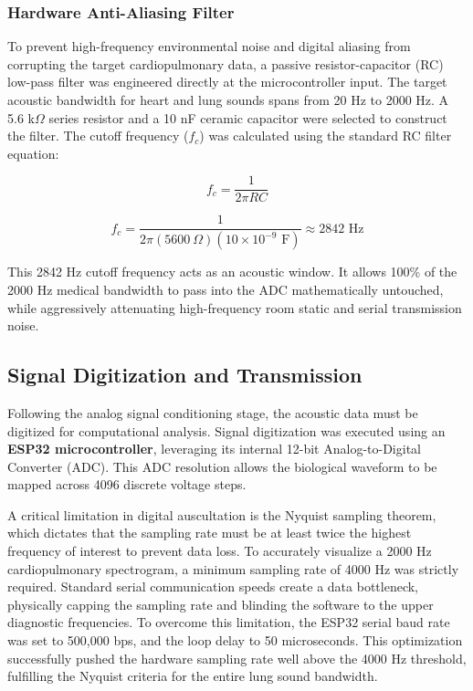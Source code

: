 \subsubsection{Hardware Anti-Aliasing Filter}
To prevent high-frequency environmental noise and digital aliasing from corrupting the target cardiopulmonary data, a passive resistor-capacitor (RC) low-pass filter was engineered directly at the microcontroller input. The target acoustic bandwidth for heart and lung sounds spans from 20 Hz to 2000 Hz. A 5.6 k$\Omega$ series resistor and a 10 nF ceramic capacitor were selected to construct the filter. The cutoff frequency ($f_c$) was calculated using the standard RC filter equation:

\begin{equation}
f_c = \frac{1}{2 \pi R C}
\end{equation}

\begin{equation}
f_c = \frac{1}{2 \pi (5600\ \Omega) (10 \times 10^{-9}\text{ F})} \approx 2842\text{ Hz}
\end{equation}

This 2842 Hz cutoff frequency acts as an acoustic window. It allows 100\% of the 2000 Hz medical bandwidth to pass into the ADC mathematically untouched, while aggressively attenuating high-frequency room static and serial transmission noise.
\subsection{Signal Digitization and Transmission}
Following the analog signal conditioning stage, the acoustic data must be digitized for computational analysis. Signal digitization was executed using an \textbf{ESP32 microcontroller}, leveraging its internal 12-bit Analog-to-Digital Converter (ADC). This ADC resolution allows the biological waveform to be mapped across 4096 discrete voltage steps. 

A critical limitation in digital auscultation is the Nyquist sampling theorem, which dictates that the sampling rate must be at least twice the highest frequency of interest to prevent data loss. To accurately visualize a 2000 Hz cardiopulmonary spectrogram, a minimum sampling rate of 4000 Hz was strictly required. Standard serial communication speeds create a data bottleneck, physically capping the sampling rate and blinding the software to the upper diagnostic frequencies. To overcome this limitation, the ESP32 serial baud rate was set to 500,000 bps, and the loop delay to 50 microseconds. This optimization successfully pushed the hardware sampling rate well above the 4000 Hz threshold, fulfilling the Nyquist criteria for the entire lung sound bandwidth.

